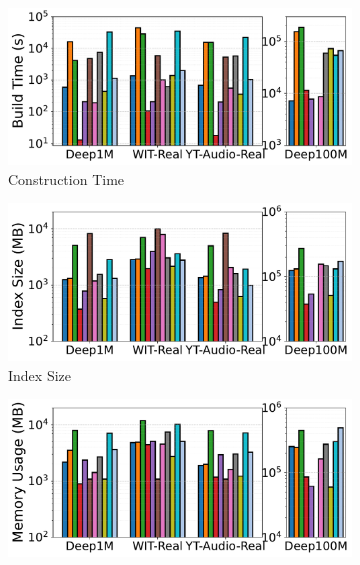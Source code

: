 \documentclass[sigconf, nonacm]{acmart}
\begin{document}
{\begin{figure}[t]
		\begin{subfigure}[t]{0.495\columnwidth}
			\centering
			\captionsetup{font=small}
			\includegraphics[width=\linewidth]{figures/indexData/rangeFilter_build_time_comparison_query.pdf}
			\caption{\footnotesize Construction Time}
			\label{fig:rangeFilter_build_time}
		\end{subfigure}
		\hfill
		\begin{subfigure}[t]{0.495\columnwidth}
			\centering
			\includegraphics[width=\linewidth]{figures/indexData/rangeFilter_index_size_mb_comparison_query.pdf}
			\caption{\footnotesize Index Size}
			\label{fig:rangeFilter_index_size_mb}
		\end{subfigure}
		\hfill
		\begin{subfigure}[t]{0.495\columnwidth}
			\centering
			\includegraphics[width=\linewidth]{figures/indexData/rangeFilter_memory_mb_comparison_query.pdf}

\end{subfigure}
\end{figure}}
\end{document}
